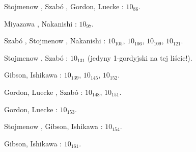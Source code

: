 \begin{compactitem}
\item Stojmenow \cite{stoimenow04}, Szabó \cite{szabo05}, Gordon, Luecke \cite{gordon06}: $10_{86}$.
\item Miyazawa \cite{miyazawa98}, Nakanishi \cite{nakanishi05}: $10_{97}$.
\item Szabó \cite{szabo05}, Stojmenow \cite{stoimenow04}, Nakanishi \cite{nakanishi05}: $10_{105}$, $10_{106}$, $10_{109}$, $10_{121}$.
\item Stojmenow \cite{stoimenow04}, Szabó \cite{szabo05}: $10_{131}$ (jedyny 1-gordyjski na tej liście!).
\item Gibson, Ishikawa \cite{ishikawa02}: $10_{139}$, $10_{145}$, $10_{152}$.
%
%
\item Gordon, Luecke \cite{gordon06}, Szabó \cite{szabo05}: $10_{148}$, $10_{151}$.
\item Gordon, Luecke \cite{gordon06}: $10_{153}$.
\item Stojmenow \cite{stoimenow03}, Gibson, Ishikawa \cite{ishikawa02}: $10_{154}$.
\item Gibson, Ishikawa \cite{ishikawa02}: $10_{161}$.
\end{compactitem}

